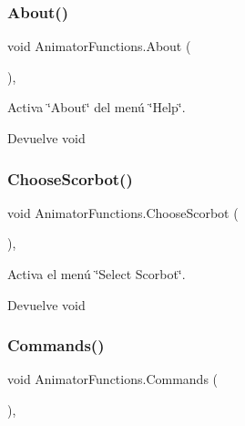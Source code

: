 \subsubsection{\texorpdfstring{About()}{About()}}
{\footnotesize\ttfamily void Animator\+Functions.\+About (\begin{DoxyParamCaption}{ }\end{DoxyParamCaption})\hspace{0.3cm}{\ttfamily [inline]}, {\ttfamily [private]}}

Activa \char`\"{}\+About\char`\"{} del menú \char`\"{}\+Help\char`\"{}. \begin{DoxyReturn}{Devuelve}
void 
\end{DoxyReturn}
\mbox{\label{class_animator_functions_a573963407750082c2ba22b276bc83cdb}} 
\subsubsection{\texorpdfstring{ChooseScorbot()}{ChooseScorbot()}}
{\footnotesize\ttfamily void Animator\+Functions.\+Choose\+Scorbot (\begin{DoxyParamCaption}{ }\end{DoxyParamCaption})\hspace{0.3cm}{\ttfamily [inline]}, {\ttfamily [private]}}

Activa el menú \char`\"{}\+Select Scorbot\char`\"{}. \begin{DoxyReturn}{Devuelve}
void 
\end{DoxyReturn}
\mbox{\label{class_animator_functions_a6dba7a70ee964424e91c9817d2edaecc}} 
\subsubsection{\texorpdfstring{Commands()}{Commands()}}
{\footnotesize\ttfamily void Animator\+Functions.\+Commands (\begin{DoxyParamCaption}{ }\end{DoxyParamCaption})\hspace{0.3cm}{\ttfamily [inline]}, {\ttfamily [private]}}


